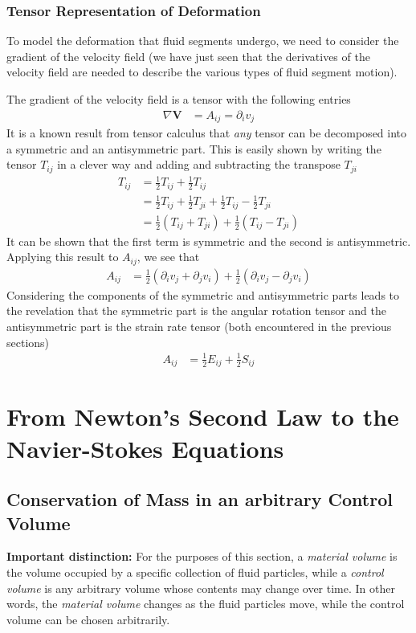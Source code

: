 \documentclass[a4paper, 12pt]{article}
\numberwithin{equation}{subsubsection}
\begin{document}
\subsubsection{Tensor Representation of Deformation}
To model the deformation that fluid segments undergo, we need to consider the gradient of the velocity field (we have just seen that the derivatives of the velocity field are needed to describe the various types of fluid segment motion).

The gradient of the velocity field is a tensor with the following entries
\begin{align}
	\nabla \mathbf{V} &= A_{ij} = \partial_i v_j
\end{align}
It is a known result from tensor calculus that \textit{any} tensor can be decomposed into a symmetric and an antisymmetric part. This is easily shown by writing the tensor $T_{ij}$ in a clever way and adding and subtracting the transpose $T_{ji}$
\begin{align*}
	T_{ij} &= \frac{1}{2} T_{ij} + \frac{1}{2} T_{ij} \\
	&= \frac{1}{2} T_{ij} + \frac{1}{2} T_{ji} + \frac{1}{2} T_{ij} - \frac{1}{2} T_{ji} \\
	&= \frac{1}{2} (T_{ij} + T_{ji}) + \frac{1}{2} (T_{ij} - T_{ji})
\end{align*}
It can be shown that the first term is symmetric and the second is antisymmetric. Applying this result to $A_{ij}$, we see that
\begin{align}
	A_{ij} &= \frac{1}{2} (\partial_i v_j + \partial_j v_i) + \frac{1}{2} (\partial_i v_j - \partial_j v_i)
\end{align}
Considering the components of the symmetric and antisymmetric parts leads to the revelation that the symmetric part is the angular rotation tensor and the antisymmetric part is the strain rate tensor (both encountered in the previous sections)
\begin{align}
	A_{ij} &= \frac{1}{2} E_{ij} + \frac{1}{2} S_{ij}
\end{align}



\section{From Newton's Second Law to the Navier-Stokes Equations}

\subsection{Conservation of Mass in an arbitrary Control Volume}
\textbf{Important distinction:} For the purposes of this section, a \textit{material volume} is the volume occupied by a specific collection of fluid particles, while a \textit{control volume} is any arbitrary volume whose contents may change over time. In other words, the \textit{material volume} changes as the fluid particles move, while the control volume can be chosen arbitrarily.
\end{document}
